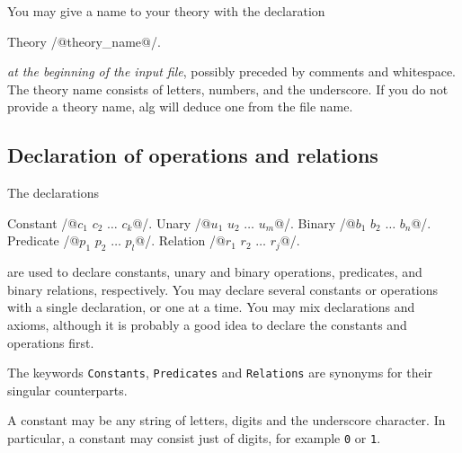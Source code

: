 \documentclass{article}
\begin{document}
You may give a name to your theory with the declaration
%
\begin{source}
Theory /@theory_name@/.
\end{source}
%
\emph{at the beginning of the input file}, possibly preceded by
comments and whitespace. The theory name consists of letters, numbers,
and the underscore. If you do not provide a theory name, alg will
deduce one from the file name.

\subsection{Declaration of operations and relations}

The declarations
%
\begin{source}
Constant /@$c_1$ $c_2$ $\ldots$ $c_k$@/.
Unary /@$u_1$ $u_2$ $\ldots$ $u_m$@/.
Binary /@$b_1$ $b_2$ $\ldots$ $b_n$@/.
Predicate /@$p_1$ $p_2$ $\ldots$ $p_l$@/.
Relation /@$r_1$ $r_2$ $\ldots$ $r_j$@/.
\end{source}
%
are used to declare constants, unary and binary operations,
predicates, and binary relations, respectively. You may declare
several constants or operations with a single declaration, or one at a
time. You may mix declarations and axioms, although it is probably a
good idea to declare the constants and operations first.

The keywords \texttt{Constants}, \texttt{Predicates} and
\texttt{Relations} are synonyms for their singular counterparts.

A constant may be any string of letters, digits and the underscore
character. In particular, a constant may consist just of digits, for
example \texttt{0} or \texttt{1}.
\end{document}
